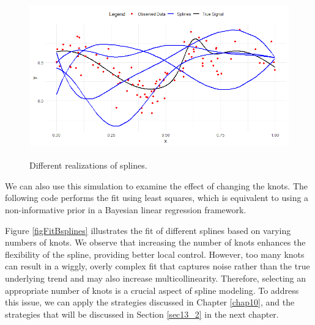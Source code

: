 \begin{figure}[!h]
	\includegraphics[width=340pt, height=200pt]{Chapters/chapter11/figures/RealizationsSplines.png}
	\caption[List of figure caption goes here]{Different realizations of splines.}\label{figRealizationBsplines}
\end{figure}

We can also use this simulation to examine the effect of changing the knots. The following code performs the fit using least squares, which is equivalent to using a non-informative prior in a Bayesian linear regression framework.

Figure \ref{figFitBsplines} illustrates the fit of different splines based on varying numbers of knots. We observe that increasing the number of knots enhances the flexibility of the spline, providing better local control. However, too many knots can result in a wiggly, overly complex fit that captures noise rather than the true underlying trend and may also increase multicollinearity. Therefore, selecting an appropriate number of knots is a crucial aspect of spline modeling. To address this issue, we can apply the strategies discussed in Chapter \ref{chap10}, and the strategies that will be discussed in Section \ref{sec13_2} in the next chapter. 

